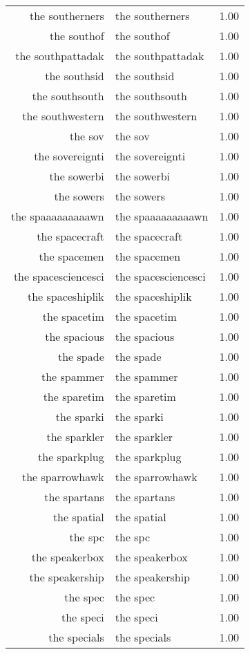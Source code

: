 \begin{table}[ht]
\begin{tabular}{rlr}
  the southerners & the southerners & 1.00 \\ 
  the southof & the southof & 1.00 \\ 
  the southpattadak & the southpattadak & 1.00 \\ 
  the southsid & the southsid & 1.00 \\ 
  the southsouth & the southsouth & 1.00 \\ 
  the southwestern & the southwestern & 1.00 \\ 
  the sov & the sov & 1.00 \\ 
  the sovereignti & the sovereignti & 1.00 \\ 
  the sowerbi & the sowerbi & 1.00 \\ 
  the sowers & the sowers & 1.00 \\ 
  the spaaaaaaaaawn & the spaaaaaaaaawn & 1.00 \\ 
  the spacecraft & the spacecraft & 1.00 \\ 
  the spacemen & the spacemen & 1.00 \\ 
  the spacesciencesci & the spacesciencesci & 1.00 \\ 
  the spaceshiplik & the spaceshiplik & 1.00 \\ 
  the spacetim & the spacetim & 1.00 \\ 
  the spacious & the spacious & 1.00 \\ 
  the spade & the spade & 1.00 \\ 
  the spammer & the spammer & 1.00 \\ 
  the sparetim & the sparetim & 1.00 \\ 
  the sparki & the sparki & 1.00 \\ 
  the sparkler & the sparkler & 1.00 \\ 
  the sparkplug & the sparkplug & 1.00 \\ 
  the sparrowhawk & the sparrowhawk & 1.00 \\ 
  the spartans & the spartans & 1.00 \\ 
  the spatial & the spatial & 1.00 \\ 
  the spc & the spc & 1.00 \\ 
  the speakerbox & the speakerbox & 1.00 \\ 
  the speakership & the speakership & 1.00 \\ 
  the spec & the spec & 1.00 \\ 
  the speci & the speci & 1.00 \\ 
  the specials & the specials & 1.00 \\ 

\end{tabular}
\end{table}
